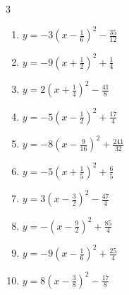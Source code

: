 \begin{multicols}{3}
\begin{enumerate}
  \item $\displaystyle y=-3\left( x-\frac{1}{6}\right)^{2}-\frac{35}{12}$


  \item $\displaystyle y=-9\left( x+\frac{1}{2}\right)^{2}+\frac{1}{4}$


  \item $\displaystyle y=2\left( x+\frac{1}{4}\right)^{2}-\frac{41}{8}$


  \item $\displaystyle y=-5\left( x-\frac{1}{2}\right)^{2}+\frac{17}{4}$


  \item $\displaystyle y=-8\left( x-\frac{9}{16}\right)^{2}+\frac{241}{32}$


  \item $\displaystyle y=-5\left( x+\frac{1}{5}\right)^{2}+\frac{6}{5}$


  \item $\displaystyle y=3\left( x-\frac{3}{2}\right)^{2}-\frac{47}{4}$


\columnbreak %

\resetques

  \item $\displaystyle y=-\left( x-\frac{9}{2}\right)^{2}+\frac{85}{4}$


  \item $\displaystyle y=-9\left( x-\frac{1}{6}\right)^{2}+\frac{25}{4}$


  \item $\displaystyle y=8\left( x-\frac{3}{8}\right)^{2}-\frac{17}{8}$


\end{enumerate}
\end{multicols}
